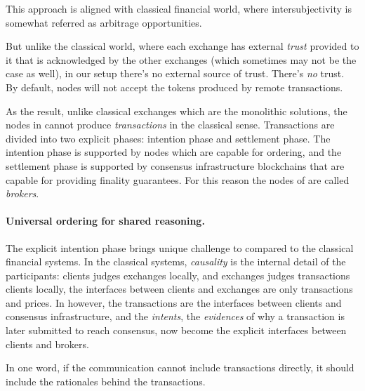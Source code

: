 This approach is aligned with classical financial world, where intersubjectivity is somewhat referred as arbitrage opportunities.


But unlike the classical world, where each exchange has external \emph{trust} provided to it that is acknowledged by the other exchanges (which sometimes may not be the case as well), in our setup there's no external source of trust.
There's \emph{no} trust.
By default, nodes will not accept the tokens produced by remote transactions.

As the result, unlike classical exchanges which are the monolithic solutions, the nodes in \sys cannot produce \emph{transactions} in the classical sense.
Transactions are divided into two explicit phases: intention phase and settlement phase.
The intention phase is supported by \sys nodes which are capable for ordering, and the settlement phase is supported by consensus infrastructure \eg blockchains that are capable for providing finality guarantees.
For this reason the nodes of \sys are called \emph{brokers}.


\paragraph{Universal ordering for shared reasoning.}
The explicit intention phase brings unique challenge to \sys compared to the classical financial systems.
In the classical systems, \emph{causality} is the internal detail of the participants: clients judges exchanges locally, and exchanges judges transactions \ie clients locally, the interfaces between clients and exchanges are only transactions and prices.
In \sys however, the transactions are the interfaces between clients and consensus infrastructure, and the \emph{intents}, \ie the \emph{evidences} of why a transaction is later submitted to reach consensus, now become the explicit interfaces between clients and brokers.

In one word, if the communication cannot include transactions directly, it should include the rationales behind the transactions.

